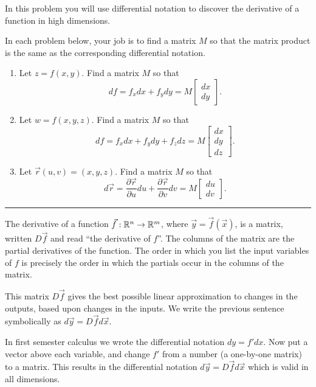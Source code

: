 In this problem you will use differential notation to discover the derivative of a function in high dimensions.
\begin{problem}%
In each problem below, your job is to find a matrix $M$ so that the matrix product is the same as the corresponding differential notation. 
\begin{enumerate}
 \item  Let $z=f(x,y)$. Find a matrix $M$ so that 
$$df=f_xdx+f_ydy=M\begin{bmatrix}dx\\dy\end{bmatrix}.$$
 \item  Let $w=f(x,y,z)$. Find a matrix $M$ so that 
$$df=f_xdx+f_ydy+f_zdz=M\begin{bmatrix}dx\\dy\\dz\end{bmatrix}.$$
 \item  Let $\vec r(u,v)=(x,y,z)$. Find a matrix $M$ so that 
$$d\vec r=\frac{\partial \vec r}{\partial u}du+\frac{\partial \vec r}{\partial v}dv=M\begin{bmatrix}du\\dv\end{bmatrix}.$$
\end{enumerate}
\hrule\end{problem}

\begin{definition}
The derivative of a function $\vec f:\mathbb{R}^n\to \mathbb{R}^m$, where $\vec y=\vec f(\vec x)$, is a matrix, written $D\vec f$ and read ``the derivative of $f$''. The columns of the matrix are the partial derivatives of the function. The order in which you list the input variables of $f$ is precisely the order in which the partials occur in the columns of the matrix.

 This matrix $D\vec f$ gives the best possible linear approximation to changes in the outputs, based upon changes in the inputs. We write the previous sentence symbolically as $d\vec y = D\vec f d\vec x$. 
\end{definition}
In first semester calculus we wrote the differential notation $dy=f'dx$.  Now put a vector above each variable, and change $f'$ from a number (a one-by-one matrix) to a matrix. This results in the differential notation $d\vec y = D\vec f d\vec x$ which is valid in all dimensions. 

